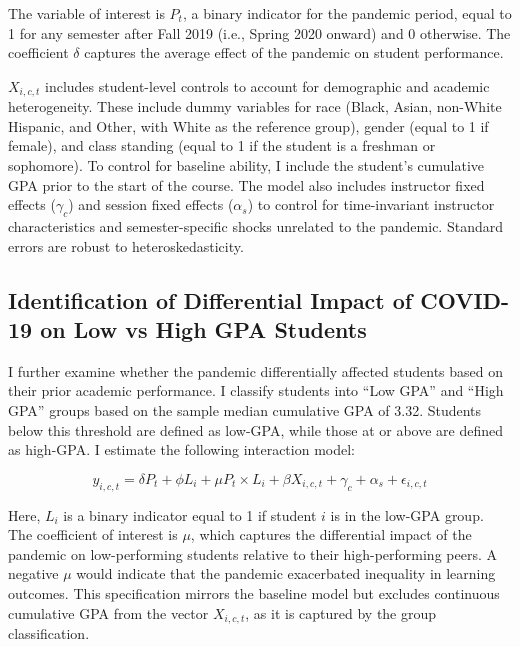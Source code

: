 \documentclass[
  12pt,
  letterpaper,
  DIV=11,
  numbers=noendperiod]{scrartcl}
\begin{document}
The variable of interest is \(P_{t}\), a binary indicator for the
pandemic period, equal to 1 for any semester after Fall 2019 (i.e.,
Spring 2020 onward) and 0 otherwise. The coefficient \(\delta\) captures
the average effect of the pandemic on student performance.

\(X_{i,c,t}\) includes student-level controls to account for demographic
and academic heterogeneity. These include dummy variables for race
(Black, Asian, non-White Hispanic, and Other, with White as the
reference group), gender (equal to 1 if female), and class standing
(equal to 1 if the student is a freshman or sophomore). To control for
baseline ability, I include the student's cumulative GPA prior to the
start of the course. The model also includes instructor fixed effects
(\(\gamma_{c}\)) and session fixed effects (\(\alpha_{s}\)) to control
for time-invariant instructor characteristics and semester-specific
shocks unrelated to the pandemic. Standard errors are robust to
heteroskedasticity.

\subsection{Identification of Differential Impact of COVID-19 on Low vs
High GPA
Students}\label{identification-of-differential-impact-of-covid-19-on-low-vs-high-gpa-students}

I further examine whether the pandemic differentially affected students
based on their prior academic performance. I classify students into
``Low GPA'' and ``High GPA'' groups based on the sample median
cumulative GPA of 3.32. Students below this threshold are defined as
low-GPA, while those at or above are defined as high-GPA. I estimate the
following interaction model:

\begin{equation}
y_{i,c,t} = \delta P_{t} + \phi L_{i} + \mu P_{t} \times L_{i} + \beta X_{i,c,t} + \gamma_{c} + \alpha_{s} + \epsilon_{i,c,t}
\end{equation}

Here, \(L_{i}\) is a binary indicator equal to 1 if student \(i\) is in
the low-GPA group. The coefficient of interest is \(\mu\), which
captures the differential impact of the pandemic on low-performing
students relative to their high-performing peers. A negative \(\mu\)
would indicate that the pandemic exacerbated inequality in learning
outcomes. This specification mirrors the baseline model but excludes
continuous cumulative GPA from the vector \(X_{i,c,t}\), as it is
captured by the group classification.
\end{document}
